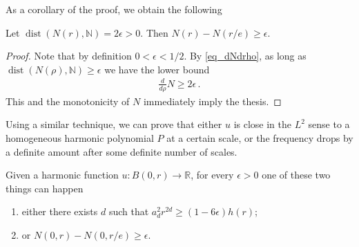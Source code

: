\documentclass[11pt]{article}
\begin{document}
As a corollary of the proof, we obtain the following
\begin{corollary}\label{cor_Npinch}
 Let $\operatorname{dist}{\left({N(r),{\mathbb{N}}}\right)}=2\epsilon >0$. Then $N(r)-N(r/e)\geq \epsilon$.
\end{corollary}
\begin{proof}
 Note that by definition $0<\epsilon<1/2$. By \eqref{eq_dNdrho}, as long as $\operatorname{dist}{\left({N(\rho),{\mathbb{N}}}\right)}\geq\epsilon$ we have the lower bound
 \begin{gather}
  \frac {d}{d\rho} N \geq 2\epsilon\, .
 \end{gather}
This and the monotonicity of $N$ immediately imply the thesis.
\end{proof}

Using a similar technique, we can prove that either $u$ is close in the $L^2$ sense to a homogeneous harmonic polynomial $P$ at a certain scale, or the frequency drops by a definite amount after some definite number of scales. 
\begin{lemma}\label{lemma_polypinch}
 Given a harmonic function $u:B(0,r)\to {\mathbb{R}}$, for every $\epsilon>0$ one of these two things can happen
\begin{enumerate}
 \item either there exists $d$ such that $a_d^2 r^{2d} \geq {\left({1-6\epsilon}\right)}h(r)$;
 \item or $N(0,r)-N(0,r/e) \geq \epsilon$.
\end{enumerate}
\end{lemma}
\end{document}
